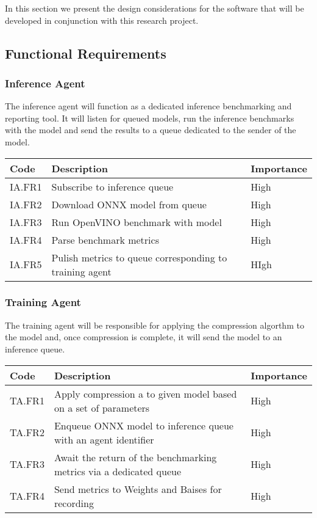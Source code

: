 \documentclass[../../D1.tex]{subfiles}
\begin{document}
In this section we present the design considerations for the software that will be developed in conjunction with this research project.

\subsection{Functional Requirements}
\subsubsection{Inference Agent}
The inference agent will function as a dedicated inference benchmarking and reporting tool. It will listen for queued models, run the inference benchmarks with the model and send the results to a queue dedicated to the sender of the model.

\begin{table}[h]
    \begin{tabular}{@{}l|p{10cm}|l@{}}
    \toprule
    Code   & Description                                             & Importance \\ \midrule
    IA.FR1 & Subscribe to inference queue                            & High       \\
    IA.FR2 & Download ONNX model from queue                          & High       \\
    IA.FR3 & Run OpenVINO benchmark with model                       & High       \\
    IA.FR4 & Parse benchmark metrics                                 & High       \\
    IA.FR5 & Pulish metrics to queue corresponding to training agent & HIgh       \\ \bottomrule
    \end{tabular}
\end{table}

\subsubsection{Training Agent}
The training agent will be responsible for applying the compression algorthm to the model and, once compression is complete, it will send the model to an inference queue.
\begin{table}[h]
    \begin{tabular}{@{}l|p{10cm}|l@{}}
    \toprule
    Code   & Description                                                        & Importance \\ \midrule
    TA.FR1 & Apply compression a to given model based on a set of parameters    & High       \\
    TA.FR2 & Enqueue ONNX model to inference queue with an agent identifier     & High       \\
    TA.FR3 & Await the return of the benchmarking metrics via a dedicated queue & High       \\
    TA.FR4 & Send metrics to Weights and Baises for recording                   & High       \\ \bottomrule
    \end{tabular}
    \end{table}
\end{document}
